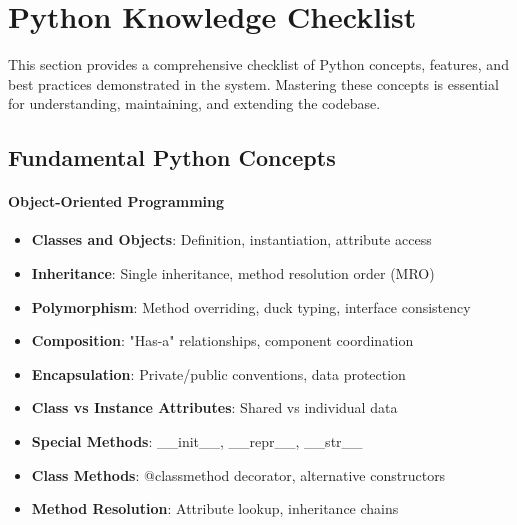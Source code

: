 \section{Python Knowledge Checklist}

This section provides a comprehensive checklist of Python concepts, features, and best practices demonstrated in the system. Mastering these concepts is essential for understanding, maintaining, and extending the codebase.

\subsection{Fundamental Python Concepts}

\paragraph{Object-Oriented Programming \starfull\starfull\starfull\starfull\starfull}
\begin{itemize}
\item[\checkmark] \textbf{Classes and Objects}: Definition, instantiation, attribute access
\item[\checkmark] \textbf{Inheritance}: Single inheritance, method resolution order (MRO)
\item[\checkmark] \textbf{Polymorphism}: Method overriding, duck typing, interface consistency
\item[\checkmark] \textbf{Composition}: "Has-a" relationships, component coordination
\item[\checkmark] \textbf{Encapsulation}: Private/public conventions, data protection
\item[\checkmark] \textbf{Class vs Instance Attributes}: Shared vs individual data
\item[\checkmark] \textbf{Special Methods}: \_\_init\_\_, \_\_repr\_\_, \_\_str\_\_
\item[\checkmark] \textbf{Class Methods}: @classmethod decorator, alternative constructors
\item[\checkmark] \textbf{Method Resolution}: Attribute lookup, inheritance chains
\end{itemize}

